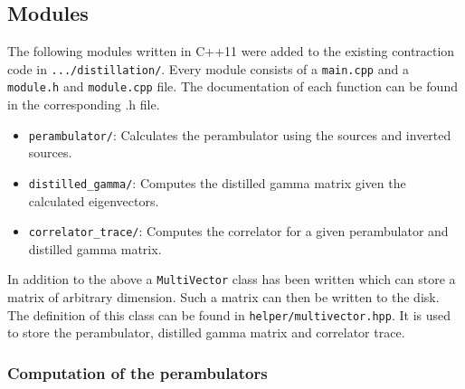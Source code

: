 \subsection{Modules}
    The following modules written in C++11 were added to the existing contraction code in \verb+.../distillation/+. Every module consists of a \verb+main.cpp+ and a \verb+module.h+ and \verb+module.cpp+ file. The documentation of each function can be found in the corresponding .h file.  
    \begin{itemize}
        \item \verb+perambulator/+: Calculates the perambulator using the sources and inverted sources.
        \item \verb+distilled_gamma/+: Computes the distilled gamma matrix given the calculated eigenvectors.
        \item \verb+correlator_trace/+: Computes the correlator for a given perambulator and distilled gamma matrix.
    \end{itemize}
    
    In addition to the above a \verb+MultiVector+ class has been written which can store a matrix of arbitrary dimension. Such a matrix can then be written to the disk. The definition of this class can be found in \verb+helper/multivector.hpp+. It is used to store the perambulator, distilled gamma matrix and correlator trace.
    
    \subsubsection{Computation of the perambulators}
        